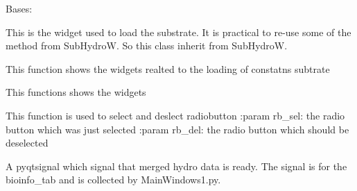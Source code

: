\documentclass[letterpaper,10pt,english]{sphinxmanual}
\begin{document}
\begin{fulllineitems}
\label{\detokenize{index:src_GUI.hydro_GUI_2.SubstrateW}}
Bases: {\hyperref[\detokenize{index:src_GUI.hydro_GUI_2.SubHydroW}]{}}

This is the widget used to load the substrate. It is practical to re-use some of the method from SubHydroW.
So this class inherit from SubHydroW.

\begin{fulllineitems}
\label{\detokenize{index:src_GUI.hydro_GUI_2.SubstrateW.add_const_widgets}}
This function shows the widgets realted to the loading of constatns subtrate

\end{fulllineitems}


\begin{fulllineitems}
\label{\detokenize{index:src_GUI.hydro_GUI_2.SubstrateW.add_file_widgets}}
This functions shows the widgets

\end{fulllineitems}


\begin{fulllineitems}
\label{\detokenize{index:src_GUI.hydro_GUI_2.SubstrateW.btnstate}}
This function is used to select and deslect radiobutton
:param rb\_sel: the radio button which was just selected
:param rb\_del: the radio button which should be deselected

\end{fulllineitems}


\begin{fulllineitems}
\label{\detokenize{index:src_GUI.hydro_GUI_2.SubstrateW.drop_merge}}
A pyqtsignal which signal that merged hydro data is ready. The signal is for the bioinfo\_tab and is collected
by MainWindows1.py.


\end{fulllineitems}
\end{fulllineitems}
\end{document}
